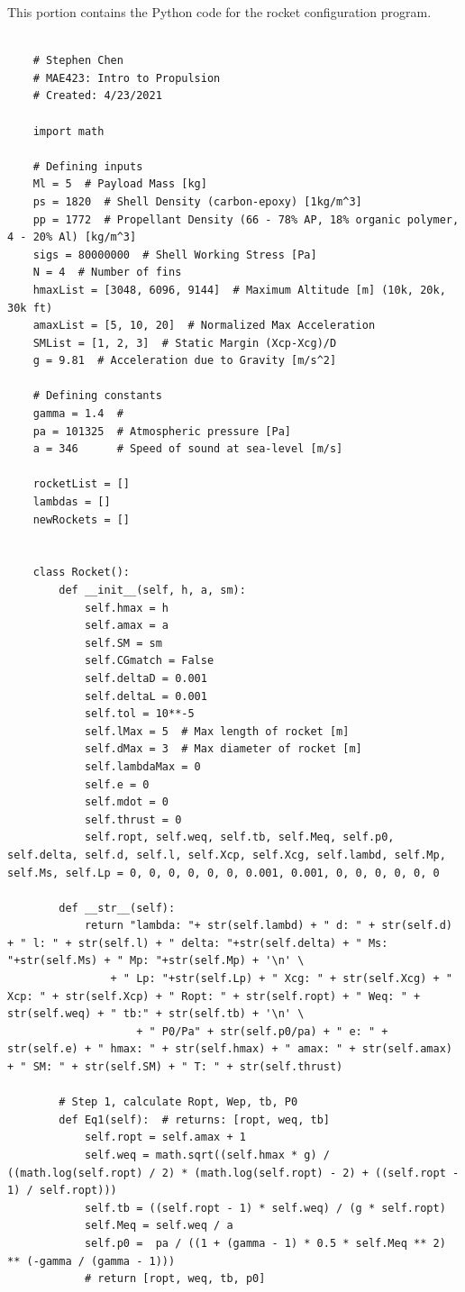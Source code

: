\documentclass{report}
\begin{document}
\noindent This portion contains the Python code for the rocket configuration program. 

\begin{lstlisting}

    # Stephen Chen
    # MAE423: Intro to Propulsion
    # Created: 4/23/2021

    import math

    # Defining inputs
    Ml = 5  # Payload Mass [kg]
    ps = 1820  # Shell Density (carbon-epoxy) [1kg/m^3]
    pp = 1772  # Propellant Density (66 - 78% AP, 18% organic polymer, 4 - 20% Al) [kg/m^3]
    sigs = 80000000  # Shell Working Stress [Pa]
    N = 4  # Number of fins
    hmaxList = [3048, 6096, 9144]  # Maximum Altitude [m] (10k, 20k, 30k ft)
    amaxList = [5, 10, 20]  # Normalized Max Acceleration
    SMList = [1, 2, 3]  # Static Margin (Xcp-Xcg)/D
    g = 9.81  # Acceleration due to Gravity [m/s^2]

    # Defining constants
    gamma = 1.4  #
    pa = 101325  # Atmospheric pressure [Pa]
    a = 346      # Speed of sound at sea-level [m/s]

    rocketList = []
    lambdas = []
    newRockets = []


    class Rocket():
        def __init__(self, h, a, sm):
            self.hmax = h
            self.amax = a
            self.SM = sm
            self.CGmatch = False
            self.deltaD = 0.001
            self.deltaL = 0.001
            self.tol = 10**-5
            self.lMax = 5  # Max length of rocket [m]
            self.dMax = 3  # Max diameter of rocket [m]
            self.lambdaMax = 0
            self.e = 0
            self.mdot = 0
            self.thrust = 0
            self.ropt, self.weq, self.tb, self.Meq, self.p0, self.delta, self.d, self.l, self.Xcp, self.Xcg, self.lambd, self.Mp, self.Ms, self.Lp = 0, 0, 0, 0, 0, 0, 0.001, 0.001, 0, 0, 0, 0, 0, 0

        def __str__(self):
            return "lambda: "+ str(self.lambd) + " d: " + str(self.d) + " l: " + str(self.l) + " delta: "+str(self.delta) + " Ms: "+str(self.Ms) + " Mp: "+str(self.Mp) + '\n' \
                + " Lp: "+str(self.Lp) + " Xcg: " + str(self.Xcg) + " Xcp: " + str(self.Xcp) + " Ropt: " + str(self.ropt) + " Weq: " + str(self.weq) + " tb:" + str(self.tb) + '\n' \
                    + " P0/Pa" + str(self.p0/pa) + " e: " + str(self.e) + " hmax: " + str(self.hmax) + " amax: " + str(self.amax) + " SM: " + str(self.SM) + " T: " + str(self.thrust)

        # Step 1, calculate Ropt, Wep, tb, P0
        def Eq1(self):  # returns: [ropt, weq, tb]
            self.ropt = self.amax + 1
            self.weq = math.sqrt((self.hmax * g) / ((math.log(self.ropt) / 2) * (math.log(self.ropt) - 2) + ((self.ropt - 1) / self.ropt)))
            self.tb = ((self.ropt - 1) * self.weq) / (g * self.ropt)
            self.Meq = self.weq / a
            self.p0 =  pa / ((1 + (gamma - 1) * 0.5 * self.Meq ** 2) ** (-gamma / (gamma - 1)))
            # return [ropt, weq, tb, p0]


\end{lstlisting}
\end{document}
